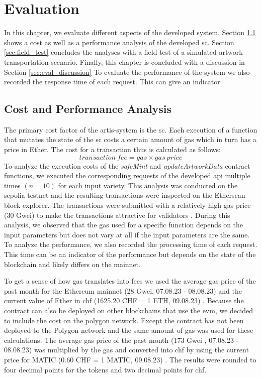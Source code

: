 \chapter{Evaluation}
\label{chap:evaluation}
In this chapter, we evaluate different aspects of the developed system. Section \ref{sec:cost_and_performance} shows a cost as well as a performance analysis of the developed \gls{sc}. Section \ref{sec:field_test} concludes the analyses with a field test of a simulated artwork transportation scenario. Finally, this chapter is concluded with a discussion in Section \ref{sec:eval_discussion} To evaluate the performance of the system we also recorded the response time of each request. This can give an indicator

\section{Cost and Performance Analysis}
\label{sec:cost_and_performance}
The primary cost factor of the artis-system is the \gls{sc}. Each execution of a function that mutates the state of the \gls{sc} costs a certain amount of gas which in turn has a price in Ether. The cost for a transaction thus is calculated as follows:
$$
transaction\ fee = gas \times gas\ price
$$
To analyze the execution costs of the \textit{safeMint} and \textit{updateArtworkData} contract functions, we executed the corresponding requests of the developed \gls{api} multiple times $(n = 10)$ for each input variety. This analysis was conducted on the sepolia testnet and the resulting transactions were inspected on the Etherscan block explorer. The transactions were submitted with a relatively high gas price (30 Gwei) to make the transactions attractive for validators \cite{ethergas}. During this analysis, we observed that the gas used for a specific function depends on the input parameters but does not vary at all if the input parameters are the same. To analyze the performance, we also recorded the processing time of each request. This time can be an indicator of the performance but depends on the state of the blockchain and likely differs on the mainnet.

To get a sense of how gas translates into fees we used the average gas price of the past month for the Ethereum mainnet (28 Gwei, 07.08.23 - 08.08.23) \cite{gaspriceaverageethereum} and the current value of Ether in \gls{chf} (1625.20 CHF = 1 ETH, 09.08.23) \cite{coinmarketcap}. Because the contract can also be deployed on other blockchains that use the \gls{evm}, we decided to include the cost on the polygon network. Except the contract has not been deployed to the Polygon network and the same amount of gas was used for these calculations. The average gas price of the past month (173 Gwei \cite{gaspriceaveragepolygon}, 07.08.23 - 08.08.23) was multiplied by the gas and converted into \gls{chf} by using the current price for MATIC (0.60 CHF = 1 MATIC, 09.08.23) \cite{coinmarketcap}. The results were rounded to four decimal points for the tokens and two decimal points for \gls{chf}.

